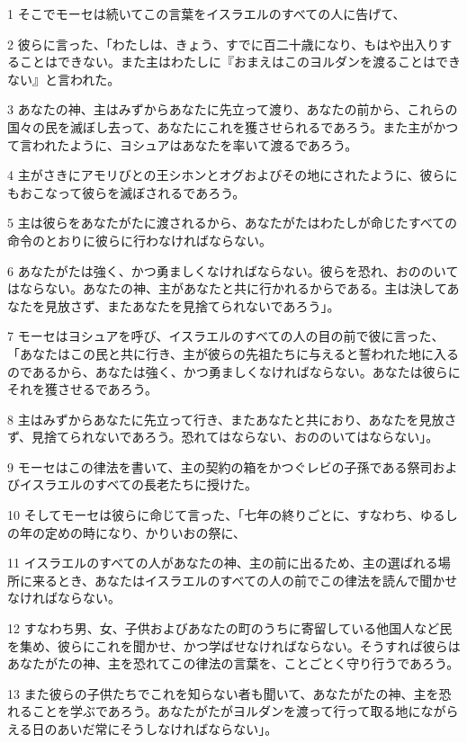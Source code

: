\par 1 そこでモーセは続いてこの言葉をイスラエルのすべての人に告げて、
\par 2 彼らに言った、「わたしは、きょう、すでに百二十歳になり、もはや出入りすることはできない。また主はわたしに『おまえはこのヨルダンを渡ることはできない』と言われた。
\par 3 あなたの神、主はみずからあなたに先立って渡り、あなたの前から、これらの国々の民を滅ぼし去って、あなたにこれを獲させられるであろう。また主がかつて言われたように、ヨシュアはあなたを率いて渡るであろう。
\par 4 主がさきにアモリびとの王シホンとオグおよびその地にされたように、彼らにもおこなって彼らを滅ぼされるであろう。
\par 5 主は彼らをあなたがたに渡されるから、あなたがたはわたしが命じたすべての命令のとおりに彼らに行わなければならない。
\par 6 あなたがたは強く、かつ勇ましくなければならない。彼らを恐れ、おののいてはならない。あなたの神、主があなたと共に行かれるからである。主は決してあなたを見放さず、またあなたを見捨てられないであろう」。
\par 7 モーセはヨシュアを呼び、イスラエルのすべての人の目の前で彼に言った、「あなたはこの民と共に行き、主が彼らの先祖たちに与えると誓われた地に入るのであるから、あなたは強く、かつ勇ましくなければならない。あなたは彼らにそれを獲させるであろう。
\par 8 主はみずからあなたに先立って行き、またあなたと共におり、あなたを見放さず、見捨てられないであろう。恐れてはならない、おののいてはならない」。
\par 9 モーセはこの律法を書いて、主の契約の箱をかつぐレビの子孫である祭司およびイスラエルのすべての長老たちに授けた。
\par 10 そしてモーセは彼らに命じて言った、「七年の終りごとに、すなわち、ゆるしの年の定めの時になり、かりいおの祭に、
\par 11 イスラエルのすべての人があなたの神、主の前に出るため、主の選ばれる場所に来るとき、あなたはイスラエルのすべての人の前でこの律法を読んで聞かせなければならない。
\par 12 すなわち男、女、子供およびあなたの町のうちに寄留している他国人など民を集め、彼らにこれを聞かせ、かつ学ばせなければならない。そうすれば彼らはあなたがたの神、主を恐れてこの律法の言葉を、ことごとく守り行うであろう。
\par 13 また彼らの子供たちでこれを知らない者も聞いて、あなたがたの神、主を恐れることを学ぶであろう。あなたがたがヨルダンを渡って行って取る地にながらえる日のあいだ常にそうしなければならない」。
